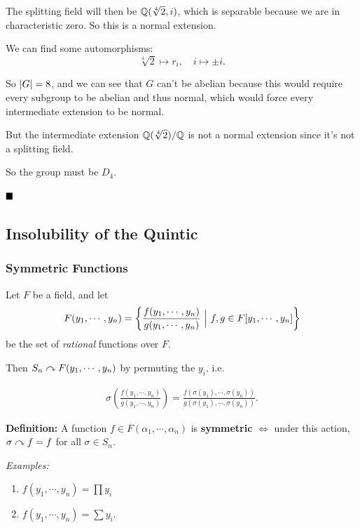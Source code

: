 The splitting field will then be \({\mathbb{Q}}(\sqrt[4] 2, i)\), which is
separable because we are in characteristic zero. So this is a normal
extension.

We can find some automorphisms: \[
\sqrt[4] 2 \mapsto r_i, \quad i \mapsto \pm i
.\]

So \({\left\lvert {G} \right\rvert} = 8\), and we can see that \(G\) can't be abelian because
this would require every subgroup to be abelian and thus normal, which
would force every intermediate extension to be normal.

But the intermediate extension \({\mathbb{Q}}(\sqrt[4] 2)/{\mathbb{Q}}\) is not a normal
extension since it's not a splitting field.

So the group must be \(D_4\).

\(\qed\)

\hypertarget{insolubility-of-the-quintic}{%
\subsection{Insolubility of the
Quintic}\label{insolubility-of-the-quintic}}

\hypertarget{symmetric-functions}{%
\subsubsection{Symmetric Functions}\label{symmetric-functions}}

Let \(F\) be a field, and let \[
F(y_1, \cdots , y_n) = \left\{{\frac{f(y_1, \cdots, y_n)}{g(y_1, \cdots, y_n)} {~\mathrel{\Big|}~} f, g \in F[y_1, \cdots, y_n]}\right\}
\] be the set of \emph{rational} functions over \(F\).

Then \(S_n \curvearrowright F(y_1, \cdots, y_n)\) by permuting the \(y_i\), i.e.

\begin{align*}
\sigma \left(\frac{
f(y_1, \cdots, y_n)
}{
g(y_1, \cdots, y_n)
}\right) = \frac{
f(\sigma(y_1), \cdots, \sigma(y_n))
}{
g(\sigma(y_1), \cdots, \sigma(y_n))
}
.\end{align*}

\textbf{Definition:} A function \(f \in F(\alpha_1, \cdots, \alpha_n)\)
is \textbf{symmetric} \(\iff\) under this action,
\(\sigma\curvearrowright f = f\) for all \(\sigma \in S_n\).

\emph{Examples:}

\begin{enumerate}
\def\labelenumi{\arabic{enumi}.}
\tightlist
\item
  \(f(y_1, \cdots, y_n) = \prod y_i\)
\item
  \(f(y_1, \cdots, y_n) = \sum y_i\).
\end{enumerate}

